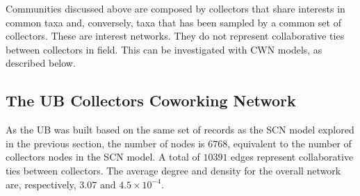 


Communities discussed above are composed by collectors that share interests in common taxa and, conversely, taxa that has been sampled by a common set of collectors.
These are interest networks.
They do not represent collaborative ties between collectors in field.
This can be investigated with CWN models, as described below.





\subsection{The UB Collectors Coworking Network}

As the UB was built based on the same set of records as the SCN model explored in the previous section, the number of nodes is $6768$, equivalent to the number of collectors nodes in the SCN model.
A total of $10391$ edges represent collaborative ties between collectors.
The average degree and density for the overall network are, respectively, $3.07$ and $4.5 \times 10^{-4}$.

